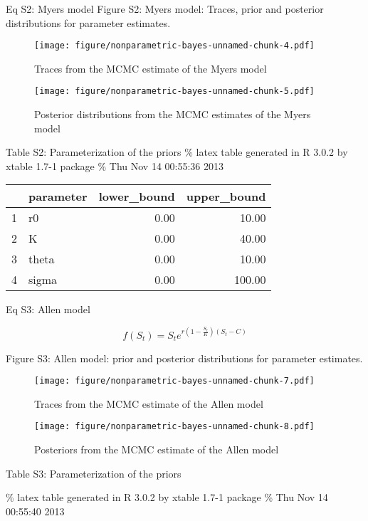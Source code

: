 \documentclass[author-year, review]{elsarticle} %
\makeatletter
\def\maxwidth{\ifdim\Gin@nat@width>\linewidth\linewidth
\else\Gin@nat@width\fi}
\let\Oldincludegraphics\includegraphics
\renewcommand{\includegraphics}[1]{\Oldincludegraphics[width=\maxwidth]{#1}}
\makeatother
\begin{document}
Eq S2: Myers model Figure S2: Myers model: Traces, prior and posterior
distributions for parameter estimates.

\begin{figure}[htbp]
\centering
\texttt{[image: figure/nonparametric-bayes-unnamed-chunk-4.pdf]}
\caption{Traces from the MCMC estimate of the Myers model}
\end{figure}

\begin{figure}[htbp]
\centering
\texttt{[image: figure/nonparametric-bayes-unnamed-chunk-5.pdf]}
\caption{Posterior distributions from the MCMC estimates of the Myers
model}
\end{figure}

Table S2: Parameterization of the priors \% latex table generated in R
3.0.2 by xtable 1.7-1 package \% Thu Nov 14 00:55:36 2013

\begin{table}[ht]
\centering
\begin{tabular}{rlrr}
  \hline
 & parameter & lower\_bound & upper\_bound \\ 
  \hline
1 & r0 & 0.00 & 10.00 \\ 
  2 & K & 0.00 & 40.00 \\ 
  3 & theta & 0.00 & 10.00 \\ 
  4 & sigma & 0.00 & 100.00 \\ 
   \hline
\end{tabular}
\end{table}

Eq S3: Allen model

\[f(S_t) = S_t e^{r \left(1 - \frac{S_t}{K}\right)\left(S_t - C\right)} \]

Figure S3: Allen model: prior and posterior distributions for parameter
estimates.

\begin{figure}[htbp]
\centering
\texttt{[image: figure/nonparametric-bayes-unnamed-chunk-7.pdf]}
\caption{Traces from the MCMC estimate of the Allen model}
\end{figure}

\begin{figure}[htbp]
\centering
\texttt{[image: figure/nonparametric-bayes-unnamed-chunk-8.pdf]}
\caption{Posteriors from the MCMC estimate of the Allen model}
\end{figure}

Table S3: Parameterization of the priors

\% latex table generated in R 3.0.2 by xtable 1.7-1 package \% Thu Nov
14 00:55:40 2013
\end{document}
